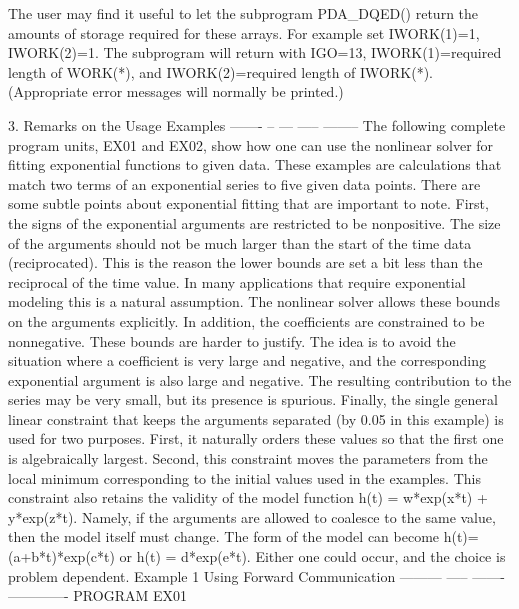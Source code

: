 \documentclass[11pt,twoside,nolof]{starlink}
\begin{document}
\begin{terminalv}
  The  user may find it useful to let the subprogram PDA_DQED() return
  the  amounts  of storage required for these arrays.  For example
  set  IWORK(1)=1,  IWORK(2)=1.   The  subprogram will return with
  IGO=13,     IWORK(1)=required    length    of    WORK(*),    and
  IWORK(2)=required   length   of  IWORK(*).   (Appropriate  error
  messages will normally be printed.)

  3. Remarks on the Usage Examples
     ------- -- --- ----- --------
  The  following  complete  program units, EX01 and EX02, show how
  one  can  use  the  nonlinear  solver  for  fitting  exponential
  functions  to  given data.  These examples are calculations that
  match  two  terms  of  an  exponential series to five given data
  points.   There are some subtle points about exponential fitting
  that   are  important  to  note.     First,  the  signs  of  the
  exponential arguments are restricted to be nonpositive.
  The size of the arguments should not be much larger than the start
  of the time data (reciprocated).  This is the reason the lower
  bounds are set a bit less than the reciprocal of the time value.
  In many applications that require exponential modeling this is a
  natural assumption.  The nonlinear solver allows these bounds
  on  the arguments explicitly.  In addition, the coefficients are
  constrained  to  be  nonnegative.   These  bounds  are harder to
  justify.  The idea is to avoid the situation where a coefficient
  is  very  large  and negative, and the corresponding exponential
  argument is also large and negative.  The resulting contribution
  to  the  series may be very small, but its presence is spurious.
  Finally,  the  single  general  linear constraint that keeps the
  arguments  separated  (by  0.05 in this example) is used for two
  purposes.   First,  it naturally orders these values so that the
  first  one  is  algebraically  largest.  Second, this constraint
  moves the parameters from the local minimum corresponding to the
  initial  values  used  in  the  examples.   This constraint also
  retains  the  validity of the model function h(t) = w*exp(x*t) +
  y*exp(z*t).  Namely, if the arguments are allowed to coalesce to
  the  same value, then the model itself must change.  The form of
  the model can become h(t)=(a+b*t)*exp(c*t) or h(t) = d*exp(e*t).
  Either one could occur, and the choice is problem dependent.
  Example 1  Using Forward Communication
  ---------  ----- ------- -------------
      PROGRAM EX01


\end{terminalv}
\end{document}
